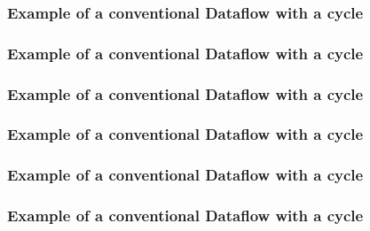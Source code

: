 \documentclass{beamer}
\begin{document}
\begin{frame}
  \frametitle{Example of a conventional Dataflow with a cycle}
  \begin{center}
    
  \end{center}
\end{frame}

\begin{frame}
  \frametitle{Example of a conventional Dataflow with a cycle}
  \begin{center}
    
  \end{center}
\end{frame}

\begin{frame}
  \frametitle{Example of a conventional Dataflow with a cycle}
  \begin{center}
    
  \end{center}
\end{frame}

\begin{frame}
  \frametitle{Example of a conventional Dataflow with a cycle}
  \begin{center}
    
  \end{center}
\end{frame}

\begin{frame}
  \frametitle{Example of a conventional Dataflow with a cycle}
  \begin{center}
    
  \end{center}
\end{frame}

\begin{frame}
  \frametitle{Example of a conventional Dataflow with a cycle}
  \begin{center}
    
  \end{center}
\end{frame}
\end{document}
